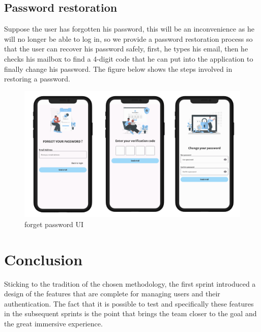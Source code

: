 \subsection{Password restoration}
Suppose the user has forgotten his password, this will be an inconvenience as he will no longer be able to log in, so we provide a password restoration process so that the user can recover his password safely, first, he types his email, then he checks his mailbox to find a 4-digit code that he can put into the application to finally change his password.
The figure below shows the steps involved in restoring a password.
\begin{figure}[H] 
            \centering
            \includegraphics[scale=0.2]{forget password signup.png}
            \caption{forget password UI} 
            \label{fig: forget password UI}
\end{figure}
\section*{Conclusion}
Sticking to the tradition of the chosen methodology, the first sprint introduced a design of the features that are complete for managing users and their authentication. The fact that it is possible to test and specifically these features in the subsequent sprints is the point that brings the team closer to the goal and the great immersive experience. 

